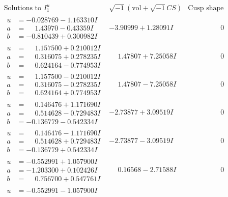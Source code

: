 \documentclass[1p]{elsarticle_modified}
\theoremstyle{definition}
\newcommand{\I}{\sqrt{-1}}
\begin{document}
$$\begin{array}{c|c|c}
\text{Solutions to }I^u_{1}& \I (\text{vol} + \sqrt{-1}CS) & \text{Cusp shape}\\
 \hline 
\begin{aligned}
u &= -0.028769 - 1.163310 I \\
a &= \phantom{-}1.43970 - 0.43359 I \\
b &= -0.810439 + 0.300982 I\end{aligned}
 & -3.90999 + 1.28091 I & \phantom{-0.000000 } 0 \\ \hline\begin{aligned}
u &= \phantom{-}1.157500 + 0.210012 I \\
a &= \phantom{-}0.316075 + 0.278235 I \\
b &= \phantom{-}0.624164 - 0.774953 I\end{aligned}
 & \phantom{-}1.47807 + 7.25058 I & \phantom{-0.000000 } 0 \\ \hline\begin{aligned}
u &= \phantom{-}1.157500 - 0.210012 I \\
a &= \phantom{-}0.316075 - 0.278235 I \\
b &= \phantom{-}0.624164 + 0.774953 I\end{aligned}
 & \phantom{-}1.47807 - 7.25058 I & \phantom{-0.000000 } 0 \\ \hline\begin{aligned}
u &= \phantom{-}0.146476 + 1.171690 I \\
a &= \phantom{-}0.514628 - 0.729483 I \\
b &= -0.136779 - 0.542334 I\end{aligned}
 & -2.73877 + 3.09519 I & \phantom{-0.000000 } 0 \\ \hline\begin{aligned}
u &= \phantom{-}0.146476 - 1.171690 I \\
a &= \phantom{-}0.514628 + 0.729483 I \\
b &= -0.136779 + 0.542334 I\end{aligned}
 & -2.73877 - 3.09519 I & \phantom{-0.000000 } 0 \\ \hline\begin{aligned}
u &= -0.552991 + 1.057900 I \\
a &= -1.203300 + 0.102426 I \\
b &= \phantom{-}0.756700 + 0.547761 I\end{aligned}
 & \phantom{-}0.16568 - 2.71588 I & \phantom{-0.000000 } 0 \\ \hline\begin{aligned}
u &= -0.552991 - 1.057900 I \\

\end{aligned}
\end{array}$$
\end{document}
